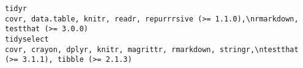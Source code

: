 \documentclass[
  letterpaper,
  DIV=11,
  numbers=noendperiod]{scrreprt}
\begin{document}
\begin{verbatim}
tidyr                                                                                                                                                                                                                                                                                                                                                                                                                                                                                                                                                                                                                                                                                                                                                                                                                                                                                                                                                                                                                                                                                                                                                                                                                 covr, data.table, knitr, readr, repurrrsive (>= 1.1.0),\nrmarkdown, testthat (>= 3.0.0)
tidyselect                                                                                                                                                                                                                                                                                                                                                                                                                                                                                                                                                                                                                                                                                                                                                                                                                                                                                                                                                                                                                                                                                                                                                                                                  covr, crayon, dplyr, knitr, magrittr, rmarkdown, stringr,\ntestthat (>= 3.1.1), tibble (>= 2.1.3)

\end{verbatim}
\end{document}
